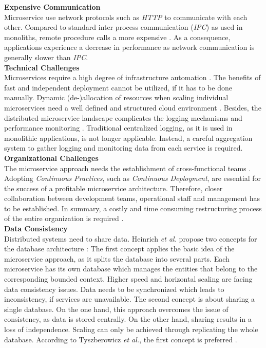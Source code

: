 \noindent
\textbf{Expensive Communication}\\
Microservice use network protocols such as \textit{HTTP} to communicate with each other. Compared to standard inter process communication (\textit{IPC}) as used in monoliths, remote procedure calls a more expensive \cite{SystematicMappingStudyMicroservice}. As a consequence, applications experience a decrease in performance as network communication is generally slower than \textit{IPC}.\\

\noindent
\textbf{Technical Challenges}\\
Microservices require a high degree of infrastructure automation \cite{MigratingTowardsSurvey}. The benefits of fast and independent deployment cannot be utilized, if it has to be done manually. Dynamic (de-)allocation of resources when scaling individual microservices need a well defined and structured cloud environment \cite{MigratingCloud}. 
Besides, the distributed microservice landscape complicates the logging mechanisms and performance monitoring \cite{SystematicMappingStudyMicroservice}. Traditional centralized logging, as it is used in monolithic applications, is not longer applicable. Instead, a careful aggregation system to gather logging and monitoring data from each service is required.\\

\noindent
\textbf{Organizational Challenges}\\
The microservice approach needs the establishment of cross-functional teams \cite{Fowler}. Adopting \textit{Continuous Practices}, such as \textit{Continuous Deployment}, are essential for the success of a profitable microservice architecture. Therefore, closer collaboration between development teams, operational staff and management has to be established. In summary, a costly and time consuming restructuring process of the entire organization is required \cite{NikoProseminar}. \\



\noindent
\textbf{Data Consistency}\\
Distributed systems need to share data. Heinrich \textit{et al.} propose two concepts for the database architecture \cite{FunctionalDecompositionHeinrich}: The first concept applies the basic idea of the microservice approach, as it splits the database into several parts. Each microservice has its own database which manages the entities that belong to the corresponding bounded context. Higher speed and horizontal scaling are facing data consistency issues. Data needs to be synchronized which leads to inconsistency, if services are unavailable. The second concept is about sharing a single database. On the one hand, this approach overcomes the issue of consistency, as data is stored centrally. On the other hand, sharing results in a loss of independence. Scaling can only be achieved through replicating the whole database. According to Tyszberowicz \textit{et al.}, the first concept is preferred \cite{FunctionalDecompositionHeinrich}. \\



